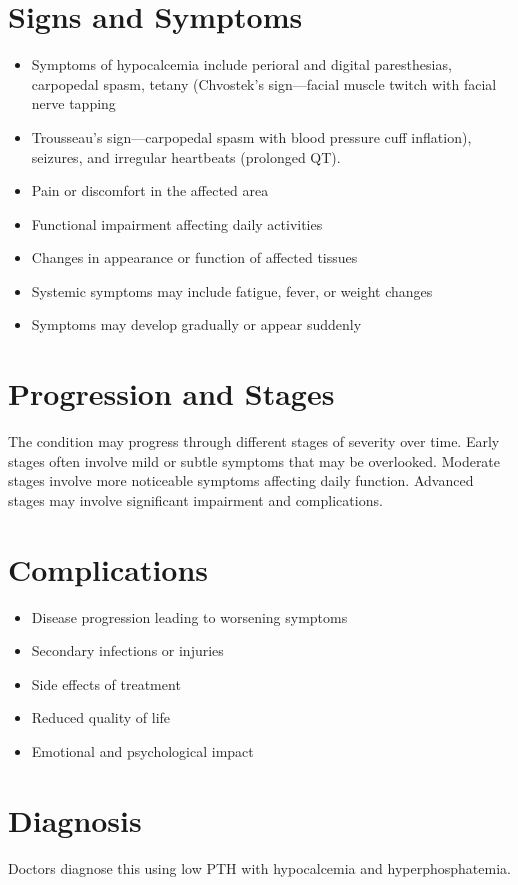 \section{Signs and Symptoms}
\begin{itemize}[noitemsep]
  \item Symptoms of hypocalcemia include perioral and digital paresthesias, carpopedal spasm, tetany (Chvostek's sign---facial muscle twitch with facial nerve tapping
  \item Trousseau's sign---carpopedal spasm with blood pressure cuff inflation), seizures, and irregular heartbeats (prolonged QT).
  \item Pain or discomfort in the affected area
  \item Functional impairment affecting daily activities
  \item Changes in appearance or function of affected tissues
  \item Systemic symptoms may include fatigue, fever, or weight changes
  \item Symptoms may develop gradually or appear suddenly
\end{itemize}
\section{Progression and Stages}
The condition may progress through different stages of severity over time. Early stages often involve mild or subtle symptoms that may be overlooked. Moderate stages involve more noticeable symptoms affecting daily function. Advanced stages may involve significant impairment and complications.
\section{Complications}
\begin{itemize}[noitemsep]
  \item Disease progression leading to worsening symptoms
  \item Secondary infections or injuries
  \item Side effects of treatment
  \item Reduced quality of life
  \item Emotional and psychological impact
\end{itemize}
\section{Diagnosis}
Doctors diagnose this using low PTH with hypocalcemia and hyperphosphatemia.

